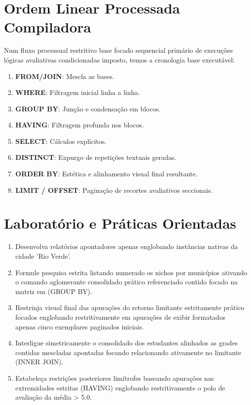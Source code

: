 \section{Ordem Linear Processada Compiladora}

Num fluxo processual restritivo base focado sequencial primário de execuções lógicas avaliativas condicionadas imposto, temos a cronologia base executável:
\begin{enumerate}
    \item \textbf{FROM/JOIN}: Mescla as bases.
    \item \textbf{WHERE}: Filtragem inicial linha a linha.
    \item \textbf{GROUP BY}: Junção e condensação em blocos.
    \item \textbf{HAVING}: Filtragem profunda nos blocos.
    \item \textbf{SELECT}: Cálculos explícitos.
    \item \textbf{DISTINCT}: Expurgo de repetições textuais geradas.
    \item \textbf{ORDER BY}: Estética e alinhamento visual final resultante.
    \item \textbf{LIMIT / OFFSET}: Paginação de recortes avaliativos seccionais.
\end{enumerate}

\section{Laboratório e Práticas Orientadas}

\begin{tcolorbox}[colback=green!5,colframe=green!40!black,title=Exercícios - Sintaxe DQL de Estruturas Restritivas Contidas]
\begin{enumerate}
    \item Desenvolva relatórios apontadores apenas englobando instâncias nativas da cidade 'Rio Verde'.
    \item Formule pesquisa estrita listando numerado os nichos por municípios ativando o comando aglomerante consolidado prático referenciado contido focado na matriz em (GROUP BY).
    \item Restrinja visual final das apurações do retorno limitante estritamente prático focados englobando restritivamente em apurações de exibir formatados apenas cinco exemplares paginados iniciais.
    \item Interligue simetricamente o consolidado dos estudantes alinhados as grades contidas mescladas apontadas focando relacionando ativamente no limitante (INNER JOIN).
    \item Estabeleça restrições posteriores limítrofes baseando apurações nas extremidades estritas (HAVING) englobando restritivamente o polo de avaliação da média > 5.0.
\end{enumerate}
\end{tcolorbox}
